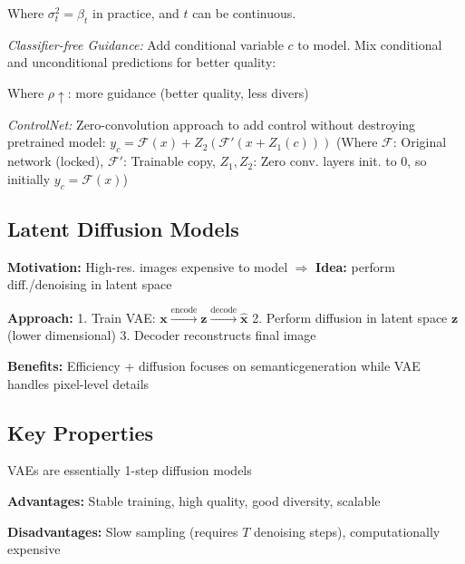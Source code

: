 Where $\sigma_t^2 = \beta_t$ in practice, and $t$ can be continuous.

\emph{Classifier-free Guidance:} Add conditional variable $c$ to model. Mix conditional and unconditional predictions for better quality:

Where $\rho \uparrow$: more guidance (better quality, less divers)

\emph{ControlNet:} Zero-convolution approach to add control without destroying pretrained model: $y_c = \mathcal{F}(x) + Z_2(\mathcal{F}'(x + Z_1(c)))$ (Where $\mathcal{F}$: Original network (locked), $\mathcal{F}'$: Trainable copy, $Z_1, Z_2$: Zero conv. layers init. to $0$, so initially $y_c = \mathcal{F}(x)$)

\subsection{Latent Diffusion Models}

\textbf{Motivation:} High-res. images expensive to model $\Rightarrow$ \textbf{Idea:} perform diff./denoising in latent space

\textbf{Approach:} 
1. Train VAE: $\mathbf{x} \xrightarrow{\text{encode}} \mathbf{z} \xrightarrow{\text{decode}} \hat{\mathbf{x}}$
2. Perform diffusion in latent space $\mathbf{z}$ (lower dimensional)
3. Decoder reconstructs final image

\textbf{Benefits:} Efficiency + diffusion focuses on \flqq semantic\frqq generation while VAE handles pixel-level details

\subsection{Key Properties}

VAEs are essentially 1-step diffusion models

\textbf{Advantages:} Stable training, high quality, good diversity, scalable

\textbf{Disadvantages:} Slow sampling (requires $T$ denoising steps), computationally expensive